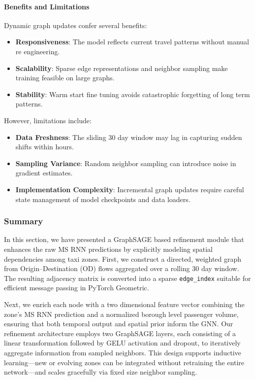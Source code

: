 \documentclass{article}
\begin{document}
\paragraph{Benefits and Limitations}  
Dynamic graph updates confer several benefits:
\begin{itemize}
  \item \textbf{Responsiveness}: The model reflects current travel patterns without manual re engineering.
  \item \textbf{Scalability}: Sparse edge representations and neighbor sampling make training feasible on large graphs.
  \item \textbf{Stability}: Warm start fine tuning avoids catastrophic forgetting of long term patterns.
\end{itemize}

However, limitations include:
\begin{itemize}
  \item \textbf{Data Freshness}: The sliding 30 day window may lag in capturing sudden shifts within hours.
  \item \textbf{Sampling Variance}: Random neighbor sampling can introduce noise in gradient estimates.
  \item \textbf{Implementation Complexity}: Incremental graph updates require careful state management of model checkpoints and data loaders.
\end{itemize}



\subsubsection{Summary}

In this section, we have presented a GraphSAGE based refinement module that enhances the raw MS RNN predictions by explicitly modeling spatial dependencies among taxi zones. First, we construct a directed, weighted graph from Origin–Destination (OD) flows aggregated over a rolling 30 day window. The resulting adjacency matrix is converted into a sparse \texttt{edge\_index} suitable for efficient message passing in PyTorch Geometric.  

Next, we enrich each node with a two dimensional feature vector combining the zone’s MS RNN prediction and a normalized borough level passenger volume, ensuring that both temporal output and spatial prior inform the GNN. Our refinement architecture employs two GraphSAGE layers, each consisting of a linear transformation followed by GELU activation and dropout, to iteratively aggregate information from sampled neighbors. This design supports inductive learning—new or evolving zones can be integrated without retraining the entire network—and scales gracefully via fixed size neighbor sampling.  
\end{document}
